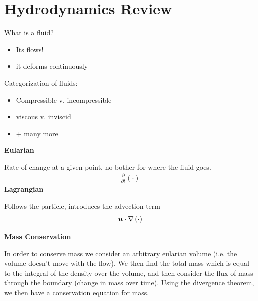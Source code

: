 \documentclass{article}
\begin{document}
\maketitle 

\tableofcontents

\setlength{\parindent}{0pt}
\setcounter{section}{1}

\section{Hydrodynamics Review}

What is a fluid?
\begin{itemize}
    \item Its flows! 
    \item it deforms continuously
\end{itemize}

Categorization of fluids:
\begin{itemize}
    \item Compressible v. incompressible
    \item viscous v. inviscid
    \item + many more
\end{itemize}

\vspace{20pt}

    \centering
    {\Large \textbf{Eularian}}
    \vspace{5pt}

    Rate of change at a given point, no bother for where the fluid goes. 
    \begin{gather*}
        \frac{\partial}{\partial t}\left(\cdot\right) 
    \end{gather*}
\emp
\hspace{5pt}
    \centering
    {\Large \textbf{Lagrangian}}
    \vspace{5pt}

    Follows the particle, introduces the advection term
    \begin{gather*}
        \boldsymbol{u}\cdot\nabla \left(\cdot\right)
    \end{gather*}
\emp

\vspace{20pt}
{\Large \textbf{Mass Conservation}}
\vspace{5pt}


In order to conserve mass we consider an arbitrary eularian volume (i.e. the
volume doesn't move with the flow). We then find the total mass which is equal
to the integral of the density over the volume, and then consider the flux of
mass through the boundary (change in mass over time). Using the divergence
theorem, we then have a conservation equation for mass. 
\end{document}
